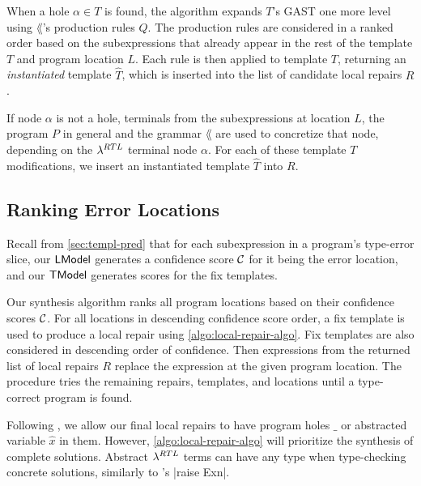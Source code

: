 When a hole $\alpha \in T$ is found, the algorithm expands $T$'s GAST one more
level using $\lang$'s production rules $Q$. The production rules are considered
in a ranked order based on the subexpressions that already appear in the rest
of the template $T$ and program location $L$. Each rule is then applied to
template $T$, returning an \emph{instantiated} template $\hat{T}$, which is
inserted into the list of candidate local repairs $R$.

If node $\alpha$ is not a hole, terminals from the subexpressions at location
$L$, the program $P$ in general and the grammar $\lang$ are used to concretize
that node, depending on the $\lambda^{RTL}$ terminal node $\alpha$. For each of
these template $T$ modifications, we insert an instantiated template $\hat{T}$
into $R$.

\subsection{Ranking Error Locations}
\label{sec:synthesis:location-rank}

Recall from \autoref{sec:templ-pred} that for each subexpression in a program's
type-error slice, our $\mathsf{LModel}$ generates a confidence score $\mathcal{C}$ for it being
the error location, and our $\mathsf{TModel}$ generates scores for the fix
templates.

Our synthesis algorithm ranks all program locations based on their confidence
scores $\mathcal{C}$. For all locations in descending confidence score order, a fix
template is used to produce a local repair using
\autoref{algo:local-repair-algo}. Fix templates are also considered in
descending order of confidence. Then expressions from the returned list of local
repairs $R$ replace the expression at the given program location. The procedure
tries the remaining repairs, templates, and locations
until a type-correct program is found.

Following \citep{Lerner2007-dt}, we allow our final local repairs to have
program holes $\_$ or abstracted variable $\hat{x}$ in them. However,
\autoref{algo:local-repair-algo} will prioritize the synthesis of complete
solutions. Abstract $\lambda^{RTL}$ terms can have any
type when type-checking concrete solutions, similarly to \ocaml's |raise Exn|.

